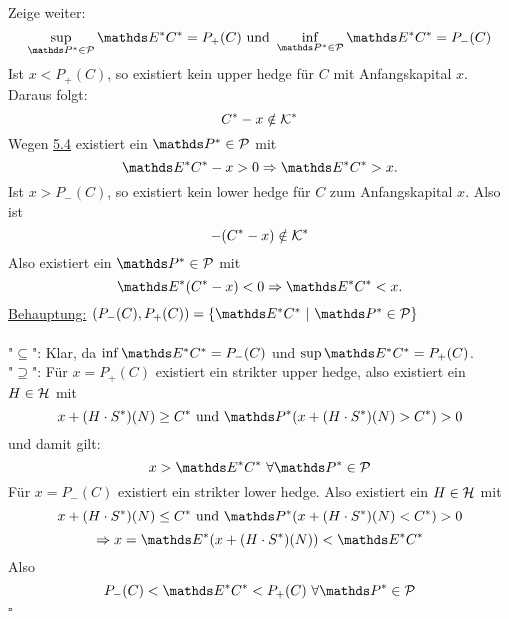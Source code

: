 Zeige weiter:
\[
\sup\limits_{\Pw^*\in\mc{P}}\E^*C^*=P_+(C) \text{ und } \inf\limits_{\Pw^*\in\mc{P}}\E^*C^*=P_-(C)
\]
Ist $x<P_+(C)$, so existiert kein upper hedge für $C$ mit Anfangskapital $x$.
Daraus folgt:
\[
C^*-x\notin \mathcal{K}^*
\]
Wegen \hyperref[sub:satz_4fima]{5.4} existiert ein $\Pw^*\in\mc{P}$ mit
\[
\E^*C^*-x>0\Rightarrow \E^*C^*>x.
\]
Ist $x>P_-(C)$, so existiert kein lower hedge für $C$ zum Anfangskapital $x$.
Also ist
\[
-(C^*-x)\notin \mathcal{K}^*
\]
Also existiert ein $\Pw^*\in\mc{P}$ mit 
\[
\E^*(C^*-x)<0 \Rightarrow \E^*C^*<x.
\]
\uline{Behauptung:}
$(P_-(C),P_+(C))=\penbrace{\E^*C^*~|~\Pw^*\in\mc{P}}$\\

\\
"$\subseteq$":
Klar, da $\inf \E^*C^*=P_-(C)$ und $\sup\E^*C^*=P_+(C)$.\\
"$\supseteq$":
Für $x=P_+(C)$ existiert ein strikter upper hedge, also existiert ein $H\in\mathcal{H}$ mit 
\[
x+(H\cdot S^*)(N)\ge C^* \text{ und }\Pw^*(x+(H\cdot S^*)(N)>C^*)>0
\]
und damit gilt:
\[
x>\E^*C^*~\forall \Pw^*\in\mc{P}
\]
Für $x=P_-(C)$ existiert ein strikter lower hedge.
Also existiert ein $H\in\mathcal{H}$ mit
\[
x+(H\cdot S^*)(N)\le C^* \text{ und } \Pw^*(x+(H\cdot S^*)(N)<C^*)>0
\]
\[
\Rightarrow x=\E^*(x+(H\cdot S^*)(N))<\E^*C^*
\]
Also
\[
P_-(C)<\E^*C^*<P_+(C)~\forall \Pw^*\in\mc{P}
\]
\hfill $\square$


